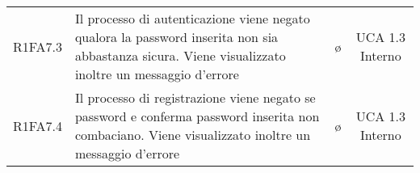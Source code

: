 {\begin{longtable}{ c C{4cm} c c}
R1FA7.3 & Il processo di autenticazione viene negato qualora la password inserita non sia abbastanza sicura. Viene visualizzato inoltre un messaggio d'errore & \o & UCA 1.3 Interno\\

R1FA7.4 & Il processo di registrazione viene negato se password e conferma password inserita non combaciano. Viene visualizzato inoltre un messaggio d'errore & \o & UCA 1.3 Interno\\





\end{longtable}
}